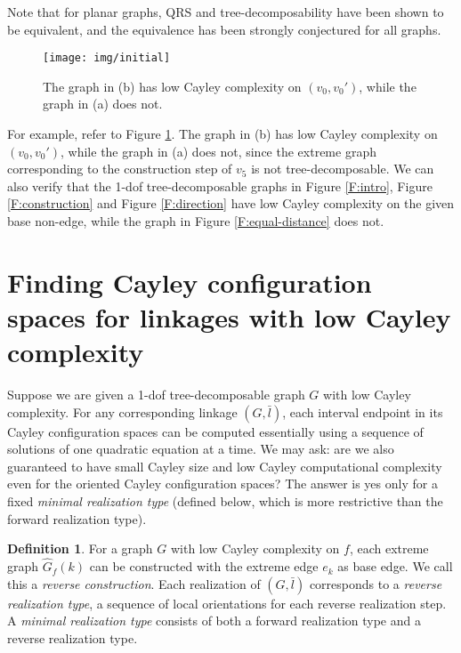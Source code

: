 \documentclass[secthm,amsthm,english]{article}
\theoremstyle{definition}
\newtheorem{definition}{Definition}
\theoremstyle{remark}
\begin{document}
Note that for planar graphs, QRS and tree-decomposability have been shown \cite{jackson2012radically} 
to be equivalent, and the equivalence has been strongly conjectured for all graphs. 

\begin{figure}[h]
	  
	  
	
	\begin{centering}
	\texttt{[image: img/initial]}
	\par\end{centering}
	
	\caption{The graph in (b) has low Cayley complexity on $(v_0,v_0')$, while the graph in (a) does not. }
	
	\label{F:not_low} 
\end{figure}

For example, refer to Figure \ref{F:not_low}. The graph in (b) has low Cayley complexity on $(v_0,v_0')$, 
while the graph in (a) does not,  since the extreme graph corresponding to the construction step of $v_5$
is not tree-decomposable. 
We can also verify that the 1-dof tree-decomposable graphs in Figure \ref{F:intro}, Figure \ref{F:construction} and Figure \ref{F:direction}  have low Cayley complexity on the given base non-edge, 
while the graph in Figure \ref{F:equal-distance} does not.





\section{Finding Cayley configuration spaces for linkages with low Cayley complexity} 
\label{sec:Find-Cayley-configuration}


Suppose we are given a 1-dof tree-decomposable graph $G$ with low Cayley complexity. 
For any corresponding linkage $(G, \bar{l})$, 
each interval endpoint in its Cayley configuration spaces can be computed essentially using
a sequence of solutions of one quadratic equation at a time. 
We may ask: are we also guaranteed to have small Cayley size and low Cayley
computational complexity even for the oriented Cayley configuration spaces? 
The answer is yes only for a fixed \emph{minimal realization type} 
(defined below, which is more restrictive than the forward realization type). 

\begin{definition}
For a graph $G$ with low Cayley complexity on $f$, each extreme graph $\hat{G}_{f}(k)$
can be constructed with the extreme edge $e_{k}$ as base edge. We call this a {\emph{reverse construction}}. 
Each realization of $(G,\bar{l})$ corresponds to a {\emph{reverse realization type}}, a sequence of local orientations for each reverse realization step.
A {\emph{minimal realization type}} consists of both a forward realization type and a reverse realization type.
\end{definition}
\end{document}

